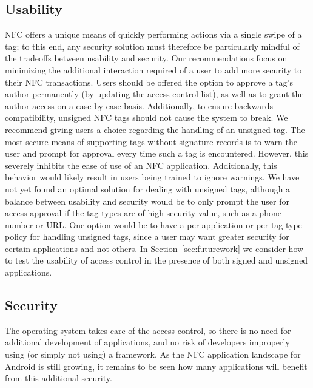 \documentclass[12pt]{article}
\begin{document}
\subsection{Usability}
NFC offers a unique means of quickly performing actions via a single swipe of a tag; to this end, any security solution must therefore be particularly mindful of the tradeoffs between usability and security.
Our recommendations focus on minimizing the additional interaction required of a user to add more security to their NFC transactions.
Users should be offered the option to approve a tag's author permanently (by updating the access control list), as well as to grant the author access on a case-by-case basis.
Additionally, to ensure backwards compatibility, unsigned NFC tags should not cause the system to break.
We recommend giving users a choice regarding the handling of an unsigned tag.
The most secure means of supporting tags without signature records is to warn the user and prompt for approval every time such a tag is encountered.
However, this severely inhibits the ease of use of an NFC application.
Additionally, this behavior would likely result in users being trained to ignore warnings.
We have not yet found an optimal solution for dealing with unsigned tags, although a balance between usability and security would be to only prompt the user for access approval if the tag types are of high security value, such as a phone number or URL.
One option would be to have a per-application or per-tag-type policy for handling unsigned tags, since a user may want greater security for certain applications and not others.
In Section~\ref{sec:futurework} we consider how to test the usability of access control in the presence of both signed and unsigned applications.

\subsection{Security}
The operating system takes care of the access control, so there is no need for additional development of applications, and no risk of developers improperly using (or simply not using) a framework.
As the NFC application landscape for Android is still growing, it remains to be seen how many applications will benefit from this additional security.
\end{document}
